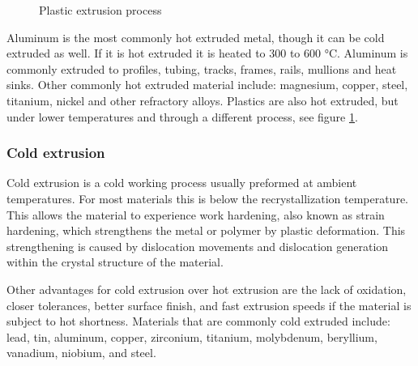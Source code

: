 \par

\begin{figure}
    {\setlength{\fboxsep}{0pt}\setlength{\fboxrule}{0.5pt}
    }
    \centering
    \captionsetup{justification=centering}
    \caption{Plastic extrusion process}
    \label{plastic_extrusion} 
\end{figure}


Aluminum is the most commonly hot extruded metal, though it can be cold extruded as well. If it is hot extruded it is heated to 300 to 600 °C. Aluminum is commonly extruded to profiles, tubing, tracks, frames, rails, mullions and heat sinks. \cite{aluminum_extrusion} Other commonly hot extruded material include: magnesium, copper, steel, titanium, nickel and other refractory alloys. Plastics are also hot extruded, but under lower temperatures and through a different process, see figure \ref{plastic_extrusion}.


\subsubsection{Cold extrusion}

Cold extrusion is a cold working process usually preformed at ambient temperatures. For most materials this is below the recrystallization temperature. This allows the material to experience work hardening, also known as strain hardening, which strengthens the metal or polymer by plastic deformation. This strengthening is caused by dislocation movements and dislocation generation within the crystal structure of the material. \cite{work_hardening} 
\par
Other advantages for cold extrusion over hot extrusion are the lack of oxidation, closer tolerances, better surface finish, and fast extrusion speeds if the material is subject to hot shortness.\cite{extrusion2} Materials that are commonly cold extruded include: lead, tin, aluminum, copper, zirconium, titanium, molybdenum, beryllium, vanadium, niobium, and steel. 

